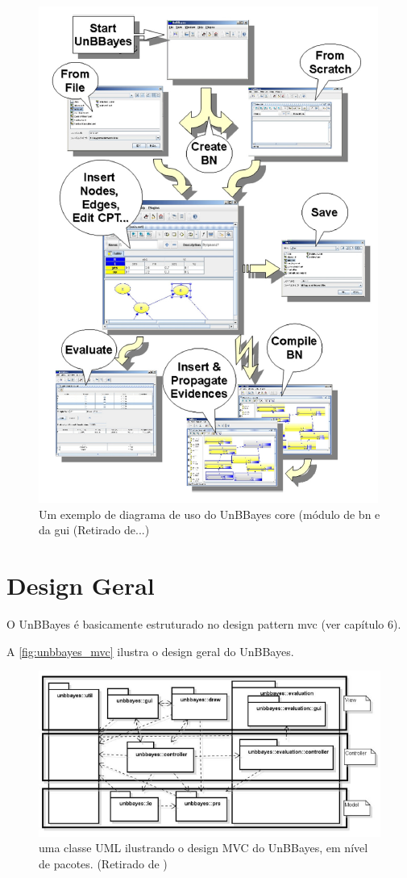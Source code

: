\begin{figure}[H]
	\centering
	\includegraphics{figuras/unbbayes_usage}
	\caption[Diagrama de uso do UnBBayes]{Um exemplo de diagrama de uso do UnBBayes core (módulo de \gls{bn} e da \gls{gui} (Retirado de...)}
	\label{fig:unbbayes_usage}
\end{figure}


\section{Design Geral}
O UnBBayes é basicamente estruturado no design pattern \gls{mvc}
(ver capítulo 6).

A \autoref{fig:unbbayes_mvc} ilustra o design geral do UnBBayes.
\begin{figure}[H]
	\centering
	\includegraphics[width = 440px]{figuras/unbbayes_mvc}
	\caption[UnBBayes UML MVC]{uma classe UML ilustrando o design MVC do UnBBayes, em nível de pacotes. (Retirado de \cite{javaApi11})}
	\label{fig:unbbayes_mvc}
\end{figure}

